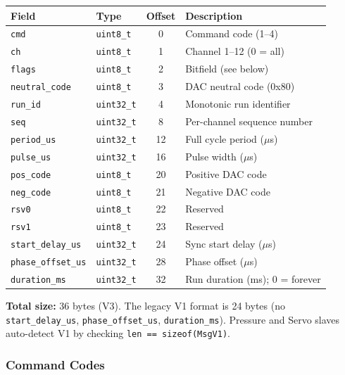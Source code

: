\documentclass[11pt,a4paper]{article}
\begin{document}
\begin{center}
\begin{tabular}{llcl}
\toprule
\textbf{Field} & \textbf{Type} & \textbf{Offset} & \textbf{Description} \\
\midrule
\texttt{cmd}            & \texttt{uint8\_t}  & 0  & Command code (1--4) \\
\texttt{ch}             & \texttt{uint8\_t}  & 1  & Channel 1--12 (0 = all) \\
\texttt{flags}          & \texttt{uint8\_t}  & 2  & Bitfield (see below) \\
\texttt{neutral\_code}  & \texttt{uint8\_t}  & 3  & DAC neutral code (0x80) \\
\texttt{run\_id}        & \texttt{uint32\_t} & 4  & Monotonic run identifier \\
\texttt{seq}            & \texttt{uint32\_t} & 8  & Per-channel sequence number \\
\texttt{period\_us}     & \texttt{uint32\_t} & 12 & Full cycle period ($\mu$s) \\
\texttt{pulse\_us}      & \texttt{uint32\_t} & 16 & Pulse width ($\mu$s) \\
\texttt{pos\_code}      & \texttt{uint8\_t}  & 20 & Positive DAC code \\
\texttt{neg\_code}      & \texttt{uint8\_t}  & 21 & Negative DAC code \\
\texttt{rsv0}           & \texttt{uint8\_t}  & 22 & Reserved \\
\texttt{rsv1}           & \texttt{uint8\_t}  & 23 & Reserved \\
\texttt{start\_delay\_us}  & \texttt{uint32\_t} & 24 & Sync start delay ($\mu$s) \\
\texttt{phase\_offset\_us} & \texttt{uint32\_t} & 28 & Phase offset ($\mu$s) \\
\texttt{duration\_ms}      & \texttt{uint32\_t} & 32 & Run duration (ms); 0 = forever \\
\bottomrule
\end{tabular}
\end{center}

\textbf{Total size:} 36 bytes (V3). The legacy V1 format is 24 bytes (no \texttt{start\_delay\_us}, \texttt{phase\_offset\_us}, \texttt{duration\_ms}). Pressure and Servo slaves auto-detect V1 by checking \texttt{len == sizeof(MsgV1)}.

\subsubsection{Command Codes}
\end{document}
